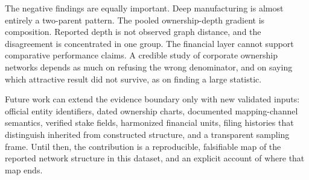 \documentclass[11pt]{article}
\begin{document}
The negative findings are equally important. Deep manufacturing is almost
entirely a two-parent pattern. The pooled ownership-depth gradient is
composition. Reported depth is not observed graph distance, and the
disagreement is concentrated in one group. The financial layer cannot support
comparative performance claims. A credible study of corporate ownership
networks depends as much on refusing the wrong denominator, and on saying which
attractive result did not survive, as on finding a large statistic.

Future work can extend the evidence boundary only with new validated inputs:
official entity identifiers, dated ownership charts, documented mapping-channel
semantics, verified stake fields, harmonized financial units, filing histories
that distinguish inherited from constructed structure, and a transparent
sampling frame. Until then, the contribution is a reproducible, falsifiable map
of the reported network structure in this dataset, and an explicit account of
where that map ends.

\clearpage
\appendix

\end{document}
